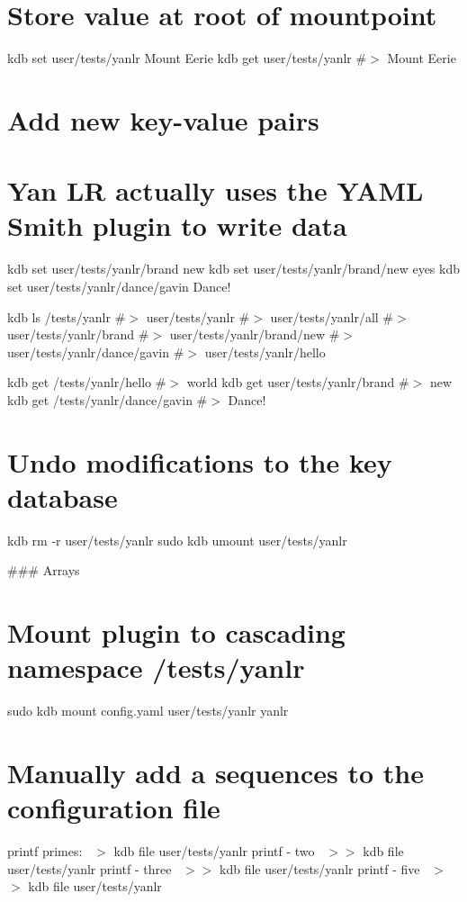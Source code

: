 \section*{Store value at root of mountpoint}

kdb set user/tests/yanlr \textquotesingle{}Mount Eerie\textquotesingle{} kdb get user/tests/yanlr \#$>$ Mount Eerie

\section*{Add new key-\/value pairs}

\section*{Yan LR actually uses the Y\+A\+ML Smith plugin to write data}

kdb set user/tests/yanlr/brand new kdb set user/tests/yanlr/brand/new eyes kdb set user/tests/yanlr/dance/gavin \textquotesingle{}Dance!\textquotesingle{}

kdb ls /tests/yanlr \#$>$ user/tests/yanlr \#$>$ user/tests/yanlr/all \#$>$ user/tests/yanlr/brand \#$>$ user/tests/yanlr/brand/new \#$>$ user/tests/yanlr/dance/gavin \#$>$ user/tests/yanlr/hello

kdb get /tests/yanlr/hello \#$>$ world kdb get user/tests/yanlr/brand \#$>$ new kdb get /tests/yanlr/dance/gavin \#$>$ Dance!

\section*{Undo modifications to the key database}

kdb rm -\/r user/tests/yanlr sudo kdb umount user/tests/yanlr 
\begin{DoxyCode}
### Arrays
\end{DoxyCode}
 \section*{Mount plugin to cascading namespace {\ttfamily /tests/yanlr}}

sudo kdb mount config.\+yaml user/tests/yanlr yanlr

\section*{Manually add a sequences to the configuration file}

printf \textquotesingle{}primes\+:~\newline
\textquotesingle{} $>$ {\ttfamily kdb file user/tests/yanlr} printf \textquotesingle{} -\/ two~\newline
\textquotesingle{} $>$$>$ {\ttfamily kdb file user/tests/yanlr} printf \textquotesingle{} -\/ three~\newline
\textquotesingle{} $>$$>$ {\ttfamily kdb file user/tests/yanlr} printf \textquotesingle{} -\/ five~\newline
\textquotesingle{} $>$$>$ {\ttfamily kdb file user/tests/yanlr}

